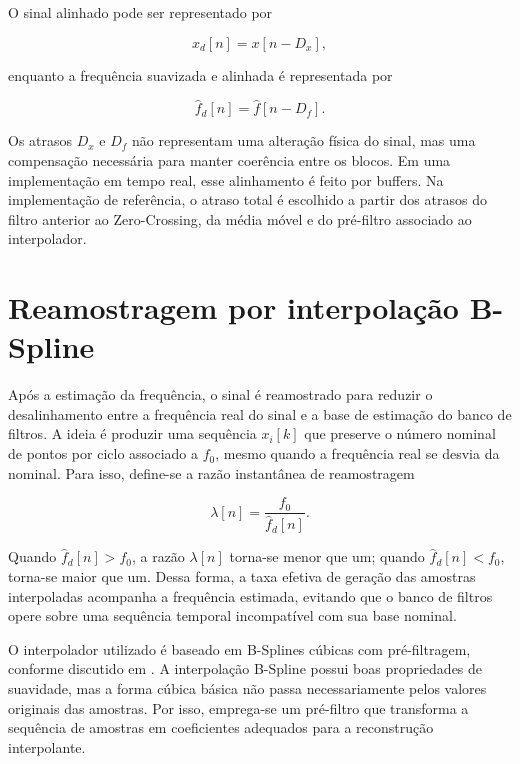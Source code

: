 O sinal alinhado pode ser representado por

\begin{equation}
x_d[n] = x[n-D_x],
\label{eq:atraso_sinal}
\end{equation}

\noindent enquanto a frequência suavizada e alinhada é representada por

\begin{equation}
\hat{f}_d[n] = \hat{f}[n-D_f].
\label{eq:atraso_freq}
\end{equation}

Os atrasos $D_x$ e $D_f$ não representam uma alteração física do sinal, mas uma compensação necessária para manter coerência entre os blocos. Em uma implementação em tempo real, esse alinhamento é feito por buffers. Na implementação de referência, o atraso total é escolhido a partir dos atrasos do filtro anterior ao Zero-Crossing, da média móvel e do pré-filtro associado ao interpolador.

\section{Reamostragem por interpolação B-Spline}

Após a estimação da frequência, o sinal é reamostrado para reduzir o desalinhamento entre a frequência real do sinal e a base de estimação do banco de filtros. A ideia é produzir uma sequência $x_i[k]$ que preserve o número nominal de pontos por ciclo associado a $f_0$, mesmo quando a frequência real se desvia da nominal. Para isso, define-se a razão instantânea de reamostragem

\begin{equation}
\lambda[n] = \frac{f_0}{\hat{f}_d[n]}.
\label{eq:lambda_reamostragem}
\end{equation}

Quando $\hat{f}_d[n] > f_0$, a razão $\lambda[n]$ torna-se menor que um; quando $\hat{f}_d[n] < f_0$, torna-se maior que um. Dessa forma, a taxa efetiva de geração das amostras interpoladas acompanha a frequência estimada, evitando que o banco de filtros opere sobre uma sequência temporal incompatível com sua base nominal.

O interpolador utilizado é baseado em B-Splines cúbicas com pré-filtragem, conforme discutido em . A interpolação B-Spline possui boas propriedades de suavidade, mas a forma cúbica básica não passa necessariamente pelos valores originais das amostras. Por isso, emprega-se um pré-filtro que transforma a sequência de amostras em coeficientes adequados para a reconstrução interpolante.

